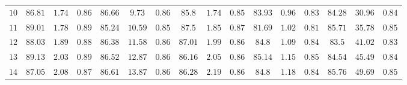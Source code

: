 \begin{table}
{\begin{tabular}{@{}cccccccccccccccc@{}}
			$10$                               & $86.81$     & $1.74$      & $0.86$ & $\mathbf{86.66}$      & $\mathbf{9.73}$       & $\mathbf{0.86}$ & $85.8$      & $1.74$      & $0.85$ & $83.93$     & $0.96$      & $0.83$ & $84.28$     & $30.96$     & $0.84$ \\
			$11$                               & $89.01$     & $1.78$      & $0.89$ & $85.24$      & $10.59$      & $0.85$ & $\mathbf{87.5}$      & $\mathbf{1.85}$      & $\mathbf{0.87}$ & $81.69$     & $1.02$      & $0.81$ & $85.71$     & $35.78$     & $0.85$ \\
			$12$                               & $88.03$     & $1.89$      & $0.88$ & $86.38$      & $11.58$      & $0.86$ & $87.01$     & $1.99$      & $0.86$ & $84.8$      & $1.09$      & $0.84$ & $83.5$      & $41.02$     & $0.83$ \\
			$13$                               & $89.13$     & $2.03$      & $0.89$ & $86.52$      & $12.87$      & $0.86$ & $86.16$     & $2.05$      & $0.86$ & $\mathbf{85.14}$     & $\mathbf{1.15}$      & $\mathbf{0.85}$ & $84.54$     & $45.49$     & $0.84$ \\
			$14$                               & $87.05$     & $2.08$      & $0.87$ & $86.61$      & $13.87$      & $0.86$ & $86.28$     & $2.19$      & $0.86$ & $84.8$      & $1.18$      & $0.84$ & $85.76$     & $49.69$     & $0.85$ \\ \bottomrule[1.25pt]
	\end{tabular}}
\end{table}


